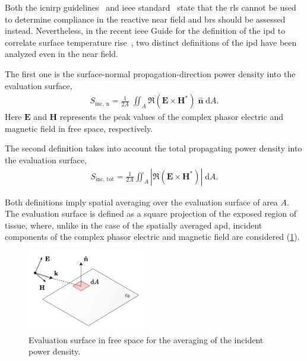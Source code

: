 Both the \gls{icnirp} guidelines~\cite{ICNIRP2020Guidelines} and \gls{ieee} standard~\cite{IEEE2019Standard} state that the \gls{rl}s cannot be used to determine compliance in the reactive near field and \gls{br}s should be assessed instead.
Nevertheless, in the recent \gls{ieee} Guide for the definition of the \gls{ipd} to correlate surface temperature rise~\cite{IEEE2021Guide}, two distinct definitions of the \gls{ipd} have been analyzed even in the near field.

The first one is the surface-normal propagation-direction power density into the evaluation surface,
\begin{align}
    \label{eqn:ipd-normal}
    S_\text{inc, n} = \frac{1}{2 A} \; \iint_A \Re \left( \mathbf{E} \times \mathbf{H}^* \right) \; \mathbf{\hat n} \; \mathrm{d}A.
\end{align}
Here $\mathbf{E}$ and $\mathbf{H}$ represents the peak values of the complex phasor electric and magnetic field in free space, respectively.

The second definition takes into account the total propagating power density into the evaluation surface,
\begin{align}
    \label{eqn:ipd-magnitude}
    S_\text{inc, tot} = \frac{1}{2A} \iint_A \left | \Re \left( \mathbf{E} \times \mathbf{H}^* \right) \right| \; \mathrm{d}A.
\end{align}

Both definitions imply spatial averaging over the evaluation surface of area $A$.
The evaluation surface is defined as a square projection of the exposed region of tissue, where, unlike in the case of the spatially averaged \gls{apd}, incident components of the complex phasor electric and magnetic field are considered (\cref{fig:averaging_surface_fs}).
\begin{figure}[t]
    \centering
    \includegraphics[width=0.46\textwidth]{artwork/averaging_surface.fs.pdf}
    \caption{Evaluation surface in free space for the averaging of the incident power density.}
    \label{fig:averaging_surface_fs}
\end{figure}

